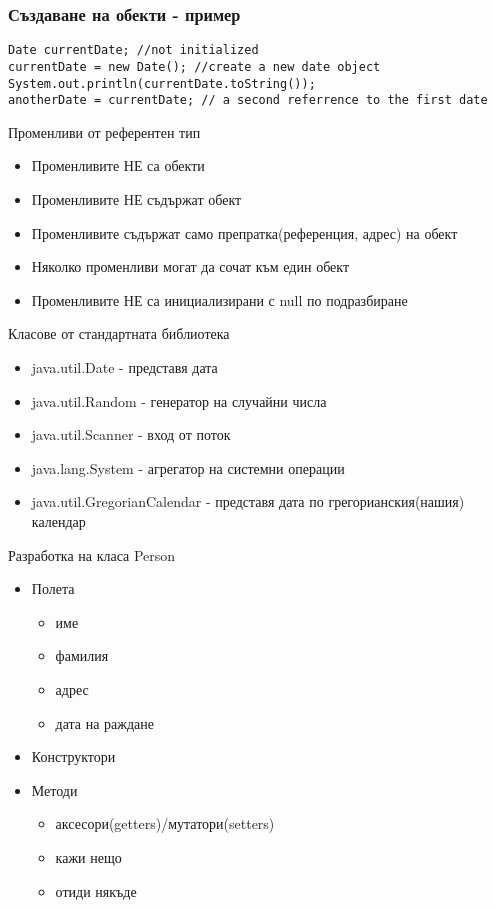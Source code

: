 \documentclass{beamer}
\begin{document}
\begin{frame}[fragile]
  \frametitle{Създаване на обекти - пример}
  \transdissolve
\begin{lstlisting}
Date currentDate; //not initialized
currentDate = new Date(); //create a new date object
System.out.println(currentDate.toString());
anotherDate = currentDate; // a second referrence to the first date
\end{lstlisting}
\end{frame}

\begin{frame}{Променливи от референтен тип}
  \transdissolve
  \begin{itemize}
  \item Променливите \alert{НЕ} са обекти
  \item Променливите \alert{НЕ} съдържат обект
  \item Променливите \alert{съдържат само
    препратка(референция, адрес)} на обект
  \item Няколко променливи могат да сочат към
    един обект
  \item Променливите \alert{НЕ} са инициализирани с
    null по подразбиране
  \end{itemize}
\end{frame}

\begin{frame}{Класове от стандартната библиотека}
  \transdissolve
  \begin{itemize}
  \item java.util.Date -  представя дата
  \item java.util.Random - генератор на случайни числа
  \item java.util.Scanner - вход от поток
  \item java.lang.System - агрегатор на системни
    операции
  \item java.util.GregorianCalendar - представя дата по
    грегорианския(нашия) календар
  \end{itemize}
\end{frame}

\begin{frame}{Разработка на класа Person}
  \transdissolve
  \begin{itemize}
  \item Полета
    \begin{itemize}
    \item име
    \item фамилия
    \item адрес
    \item дата на раждане
    \end{itemize}
  \item Конструктори
  \item Методи
    \begin{itemize}
    \item аксесори(getters)/мутатори(setters)
    \item кажи нещо
    \item отиди някъде
    \end{itemize}
  \end{itemize}
\end{frame}
\end{document}
